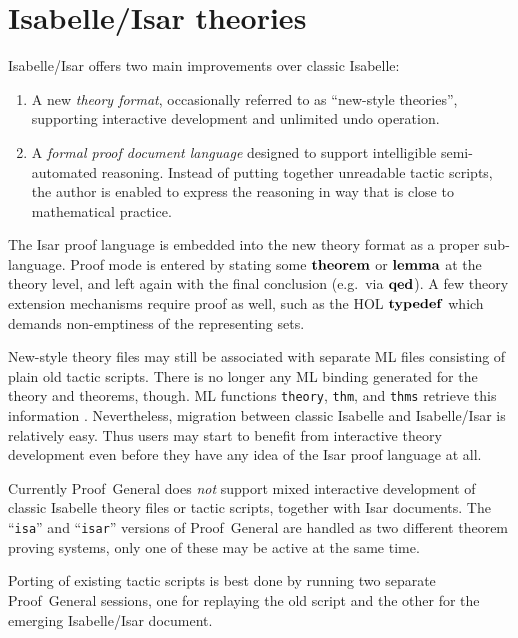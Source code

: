 \section{Isabelle/Isar theories}

Isabelle/Isar offers two main improvements over classic Isabelle:
\begin{enumerate}
\item A new \emph{theory format}, occasionally referred to as ``new-style
  theories'', supporting interactive development and unlimited undo operation.
\item A \emph{formal proof document language} designed to support intelligible
  semi-automated reasoning.  Instead of putting together unreadable tactic
  scripts, the author is enabled to express the reasoning in way that is close
  to mathematical practice.
\end{enumerate}

The Isar proof language is embedded into the new theory format as a proper
sub-language.  Proof mode is entered by stating some ${\mathord{\mathbf{theorem}}}$ or
${\mathord{\mathbf{lemma}}}$ at the theory level, and left again with the final conclusion
(e.g.\ via ${\mathord{\mathbf{qed}}}$).  A few theory extension mechanisms require proof as
well, such as the HOL ${\mathord{\mathbf{typedef}}}$ which demands non-emptiness of
the representing sets.

New-style theory files may still be associated with separate ML files
consisting of plain old tactic scripts.  There is no longer any ML binding
generated for the theory and theorems, though.  ML functions \texttt{theory},
\texttt{thm}, and \texttt{thms} retrieve this information \cite{isabelle-ref}.
Nevertheless, migration between classic Isabelle and Isabelle/Isar is
relatively easy.  Thus users may start to benefit from interactive theory
development even before they have any idea of the Isar proof language at all.

\begin{warn}
  Currently Proof~General does \emph{not} support mixed interactive
  development of classic Isabelle theory files or tactic scripts, together
  with Isar documents.  The ``\texttt{isa}'' and ``\texttt{isar}'' versions of
  Proof~General are handled as two different theorem proving systems, only one
  of these may be active at the same time.
\end{warn}

Porting of existing tactic scripts is best done by running two separate
Proof~General sessions, one for replaying the old script and the other for the
emerging Isabelle/Isar document.


